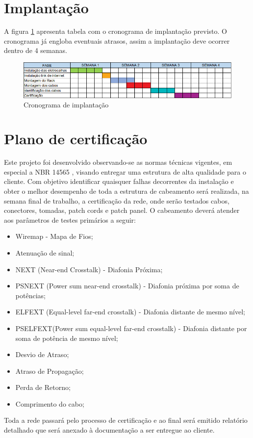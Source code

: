 \documentclass[	DIV=calc,%
paper=a4,%
fontsize=12pt,%
onecolumn]{scrartcl}	 					%
\begin{document}
	\section{Implantação}
A figura \ref{fig5} apresenta tabela com o cronograma de implantação previsto. O cronograma já engloba eventuais atrasos, assim a implantação deve ocorrer dentro de 4 semanas.
		\begin{figure}[h]
			\centering
			
			\includegraphics[width=\textwidth]{fig5}
			\caption{Cronograma de implantação}
			\label{fig5}
		\end{figure}
	
	\section{Plano de certificação}
Este projeto foi desenvolvido observando-se as normas técnicas vigentes, em especial a NBR 14565 \cite{ref3}, visando entregar uma estrutura de alta qualidade para o cliente. Com objetivo identificar quaisquer falhas decorrentes da instalação e obter o melhor desempenho de toda a estrutura de cabeamento será realizada, na semana final de trabalho, a certificação da rede, onde serão testados cabos, conectores, tomadas, patch cords e patch panel. O cabeamento deverá atender aos parâmetros de testes primários a seguir:
	\begin{itemize}
	\item Wiremap - Mapa de Fios;
	\item Atenuação de sinal;
	\item NEXT (Near-end Crosstalk) - Diafonia Próxima;
	\item PSNEXT (Power sum near-end crosstalk) - Diafonia próxima por soma de potências;
	\item ELFEXT (Equal-level far-end crosstalk) - Diafonia distante de mesmo nível;
	\item PSELFEXT(Power sum equal-level far-end crosstalk) - Diafonia distante por soma de potência de mesmo nível;
	\item Desvio de Atraso;
	\item Atraso de Propagação;
	\item Perda de Retorno;
	\item Comprimento do cabo;
	\end{itemize}
Toda a rede passará pelo processo de certificação e ao final será emitido relatório detalhado que será anexado à documentação a ser entregue ao cliente.
	
\end{document}
